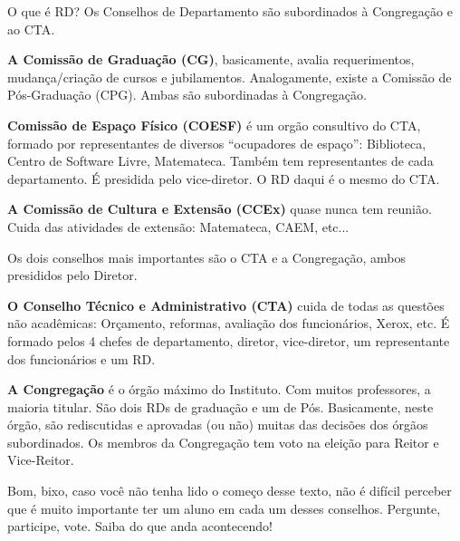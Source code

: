 \begin{secao}{O que é RD?}
Os Conselhos de Departamento são subordinados à Congregação e ao CTA.

{\bf A Comissão de Graduação (CG)}, basicamente, avalia requerimentos,
mudança/criação de cursos e jubilamentos. Analogamente, existe a Comissão de
Pós-Graduação (CPG). Ambas são subordinadas à Congregação.

{\bf Comissão de Espaço Físico (COESF)} é um orgão consultivo do CTA, formado
por representantes de diversos ``ocupadores de espaço'': Biblioteca, Centro de
Software Livre, Matemateca. Também tem representantes de cada departamento. É
presidida pelo vice-diretor. O RD daqui é o mesmo do CTA.

{\bf A Comissão de Cultura e Extensão (CCEx)} quase nunca tem reunião. Cuida
das atividades de extensão: Matemateca, CAEM, etc...

Os dois conselhos mais importantes são o CTA e a Congregação, ambos presididos
pelo Diretor.

{\bf O Conselho Técnico e Administrativo (CTA)} cuida de todas as questões não
acadêmicas: Orçamento, reformas, avaliação dos funcionários, Xerox, etc. É 
formado pelos 4 chefes de departamento, diretor, vice-diretor, um
representante dos funcionários e um RD.

{\bf A Congregação} é o órgão máximo do Instituto. Com muitos professores, a
maioria titular. São dois RDs de graduação e um de Pós. Basicamente,
neste órgão, são rediscutidas e aprovadas (ou não) muitas das decisões
dos órgãos subordinados. Os membros da Congregação tem voto na eleição para
Reitor e Vice-Reitor.

Bom, bixo, caso você não tenha lido o começo desse texto, não é difícil
perceber que é muito importante ter um aluno em cada um desses conselhos.
Pergunte, participe, vote. Saiba do que anda acontecendo!
\end{secao}
